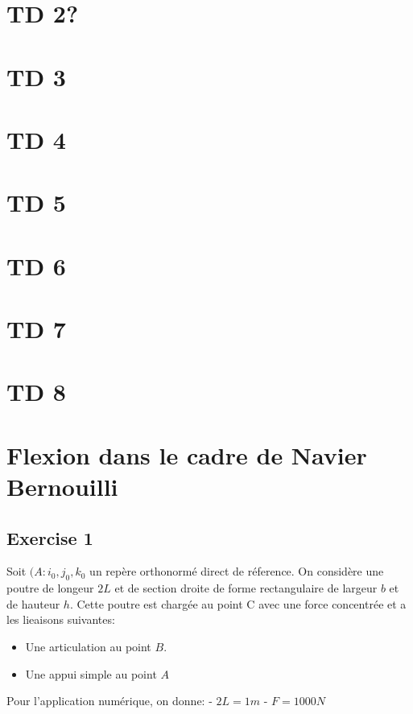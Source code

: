 \documentclass[
]{book}
\providecommand{\tightlist}{%
  \setlength{\itemsep}{0pt}\setlength{\parskip}{0pt}}
\begin{document}
\hypertarget{td-2}{%
\chapter{TD 2?}\label{td-2}}

\hypertarget{td-3}{%
\chapter{TD 3}\label{td-3}}

\hypertarget{td-4}{%
\chapter{TD 4}\label{td-4}}

\hypertarget{td-5}{%
\chapter{TD 5}\label{td-5}}

\hypertarget{td-6}{%
\chapter{TD 6}\label{td-6}}

\hypertarget{td-7}{%
\chapter{TD 7}\label{td-7}}

\hypertarget{td-8}{%
\chapter{TD 8}\label{td-8}}

\hypertarget{flexion-dans-le-cadre-de-navier-bernouilli}{%
\chapter{Flexion dans le cadre de Navier Bernouilli}\label{flexion-dans-le-cadre-de-navier-bernouilli}}

\hypertarget{exercise-1-1}{%
\section{Exercise 1}\label{exercise-1-1}}

Soit \((A: i_{0}, j_{0}, k_{0}\) un repère orthonormé direct de réference.
On considère une poutre de longeur \(2L\) et de section droite de forme rectangulaire de largeur \(b\) et de hauteur \(h\).
Cette poutre est chargée au point C avec une force concentrée et a les lieaisons suivantes:

\begin{itemize}
\tightlist
\item
  Une articulation au point \(B\).
\item
  Une appui simple au point \(A\)
\end{itemize}

Pour l'application numérique, on donne:
- \(2L = 1m\)
- \(F=1000 N\)

  
\end{document}
